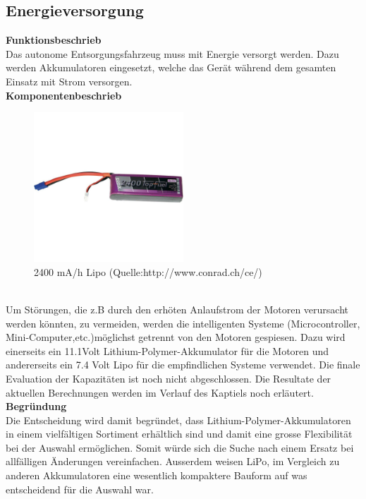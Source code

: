 \subsection{Energieversorgung}

\textbf{Funktionsbeschrieb}\\[0.2cm]
Das autonome Entsorgungsfahrzeug muss mit Energie versorgt werden. Dazu werden Akkumulatoren eingesetzt, welche das Gerät während dem gesamten Einsatz mit Strom versorgen. 
\\[0.2cm]
\textbf{Komponentenbeschrieb}\\[0.2cm]
\begin{figure}[h]
\centering
\includegraphics[width=0.5\textwidth]{03_Loesungskonzept/pictures/lipo.jpg}
\caption{2400 mA/h Lipo  (Quelle:http://www.conrad.ch/ce/)}	
\end{figure}\\[0.2cm]
Um Störungen, die z.B durch den erhöten Anlaufstrom der Motoren verursacht werden könnten, zu vermeiden, werden die intelligenten Systeme (Microcontroller, Mini-Computer,etc.)möglichst getrennt von den Motoren gespiesen. Dazu wird einerseits ein 11.1Volt Lithium-Polymer-Akkumulator für die Motoren und andererseits ein 7.4 Volt Lipo für die empfindlichen Systeme  verwendet. Die finale Evaluation der Kapazitäten ist noch nicht abgeschlossen. Die Resultate der aktuellen Berechnungen werden im Verlauf des Kaptiels noch erläutert.
 \\[0.2cm]
\textbf{Begründung}\\[0.2cm]
Die Entscheidung wird damit begründet, dass Lithium-Polymer-Akkumulatoren in einem vielfältigen Sortiment erhältlich sind und damit eine grosse Flexibilität bei der Auswahl ermöglichen. Somit würde sich die Suche nach einem Ersatz bei allfälligen Änderungen vereinfachen. Ausserdem weisen LiPo, im Vergleich zu anderen Akkumulatoren eine wesentlich kompaktere Bauform auf was entscheidend für die Auswahl war. \\[0.2cm]

